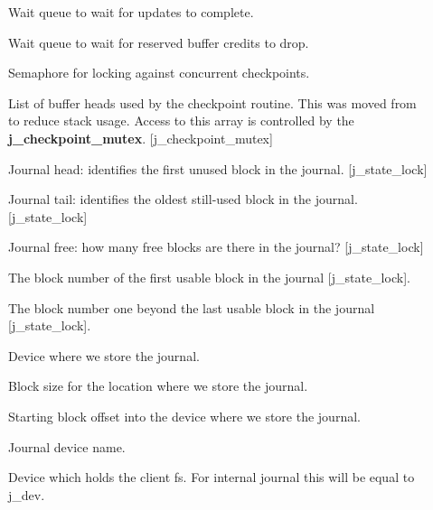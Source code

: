 \documentclass[a4paper,8pt,english]{sphinxmanual}
\begin{document}
\begin{description}
\item[{}] \leavevmode
Wait queue to wait for updates to complete.

\item[{}] \leavevmode
Wait queue to wait for reserved buffer credits to drop.

\item[{}] \leavevmode
Semaphore for locking against concurrent checkpoints.

\item[{}] \leavevmode
List of buffer heads used by the checkpoint routine.  This
was moved from  to reduce stack
usage.  Access to this array is controlled by the
\textbf{j\_checkpoint\_mutex}.  {[}j\_checkpoint\_mutex{]}

\item[{}] \leavevmode
Journal head: identifies the first unused block in the journal.
{[}j\_state\_lock{]}

\item[{}] \leavevmode
Journal tail: identifies the oldest still-used block in the journal.
{[}j\_state\_lock{]}

\item[{}] \leavevmode
Journal free: how many free blocks are there in the journal?
{[}j\_state\_lock{]}

\item[{}] \leavevmode
The block number of the first usable block in the journal
{[}j\_state\_lock{]}.

\item[{}] \leavevmode
The block number one beyond the last usable block in the journal
{[}j\_state\_lock{]}.

\item[{}] \leavevmode
Device where we store the journal.

\item[{}] \leavevmode
Block size for the location where we store the journal.

\item[{}] \leavevmode
Starting block offset into the device where we store the journal.

\item[{}] \leavevmode
Journal device name.

\item[{}] \leavevmode
Device which holds the client fs.  For internal journal this will be
equal to j\_dev.


\end{description}
\end{document}
